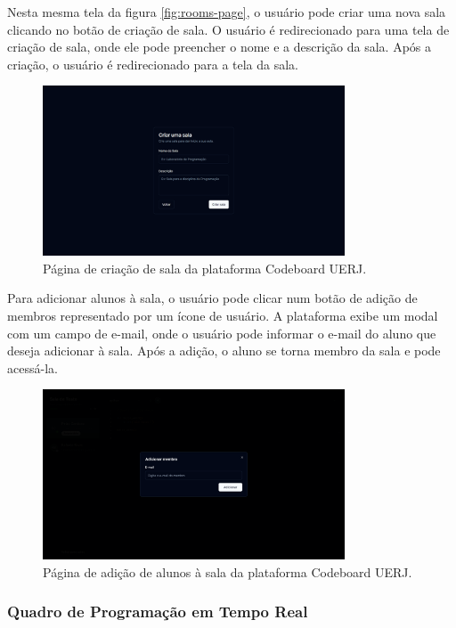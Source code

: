 Nesta mesma tela da figura \ref{fig:rooms-page}, o usuário pode criar uma nova sala clicando no botão de criação de sala. O usuário é redirecionado para uma tela de criação de sala, onde ele pode preencher o nome e a descrição da sala. Após a criação, o usuário é redirecionado para a tela da sala.

\begin{figure}[H]
    \centering
    \includegraphics[width=0.8\textwidth]{assets/codeboard/create-room-page.png}
    \caption{Página de criação de sala da plataforma Codeboard UERJ.}
    \label{fig:create-room-page}
\end{figure}

Para adicionar alunos à sala, o usuário pode clicar num botão de adição de membros representado por um ícone de usuário. A plataforma exibe um modal com um campo de e-mail, onde o usuário pode informar o e-mail do aluno que deseja adicionar à sala. Após a adição, o aluno se torna membro da sala e pode acessá-la.

\begin{figure}[H]
    \centering
    \includegraphics[width=0.8\textwidth]{assets/codeboard/add-member-modal.png}
    \caption{Página de adição de alunos à sala da plataforma Codeboard UERJ.}
    \label{fig:add-member-modal}
\end{figure}

\subsubsection{Quadro de Programação em Tempo Real}

